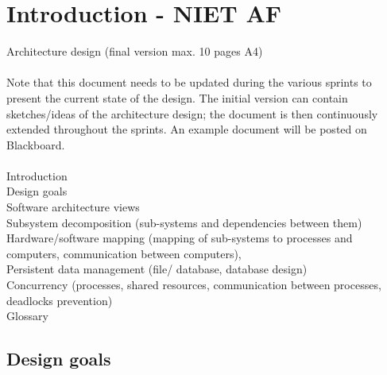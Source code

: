 \section{Introduction - NIET AF}

Architecture design (final version max. 10 pages A4) \\
\\
Note that this document needs to be updated during the various sprints to present the current state of the design. The initial version can contain sketches/ideas of the architecture design; the document is then continuously extended throughout the sprints. An example document will be posted on Blackboard.\\\\
Introduction\\
Design goals\\
Software architecture views\\
Subsystem decomposition (sub-systems and dependencies between them)\\
Hardware/software mapping (mapping of sub-systems to processes and computers, communication between computers),\\
Persistent data management (file/ database, database design)\\
Concurrency (processes, shared resources, communication between processes, deadlocks prevention)\\
Glossary\\



\subsection{Design goals}

\newpage